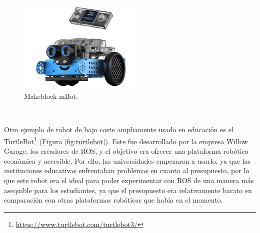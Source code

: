 \begin{figure} [H]
  \begin{center}
    \includegraphics[width=6cm]{figs/mbot-2.jpg}
  \end{center}
  \caption{Makeblock mBot.}
  \label{fig:mbot-2}
\end{figure}\


Otro ejemplo de robot de bajo coste ampliamente usado en educación es el TurtleBot\footnote{\url{https://www.turtlebot.com/turtlebot3/}} (Figura \ref{fig:turtlebot}). Este fue desarrollado por la empresa Willow Garage, los creadores de ROS, y el objetivo era ofrecer una plataforma robótica económica y accesible. Por ello, las universidades empezaron a usarlo, ya que las instituciones educativas enfrentaban problemas en cuanto al presupuesto, por lo que este robot era el ideal para poder experimentar con ROS de una manera más asequible para los estudiantes, ya que el presupuesto era relativamente barato en comparación con otras plataformas robóticas que había en el momento.

